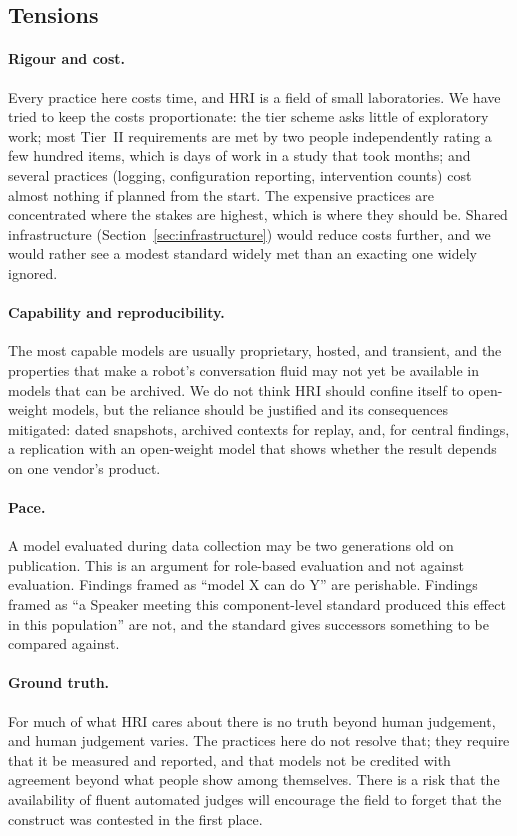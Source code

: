 \subsection{Tensions}

\paragraph{Rigour and cost.} Every practice here costs time, and HRI is a
field of small laboratories. We have tried to keep the costs proportionate:
the tier scheme asks little of exploratory work; most Tier~II requirements
are met by two people independently rating a few hundred items, which is days
of work in a study that took months; and several practices (logging,
configuration reporting, intervention counts) cost almost nothing if planned
from the start. The expensive practices are concentrated where the stakes
are highest, which is where they should be. Shared infrastructure
(Section~\ref{sec:infrastructure}) would reduce costs further, and we would
rather see a modest standard widely met than an exacting one widely ignored.

\paragraph{Capability and reproducibility.} The most capable models are
usually proprietary, hosted, and transient, and the properties that make a
robot's conversation fluid may not yet be available in models that can be
archived. We do not think HRI should confine itself to open-weight models,
but the reliance should be justified \cite{palmer2024using} and its
consequences mitigated: dated snapshots, archived contexts for replay, and,
for central findings, a replication with an open-weight model that shows
whether the result depends on one vendor's product.

\paragraph{Pace.} A model evaluated during data collection may be two
generations old on publication. This is an argument for role-based evaluation
and not against evaluation. Findings framed as ``model X can do Y'' are
perishable. Findings framed as ``a Speaker meeting this component-level
standard produced this effect in this population'' are not, and the standard
gives successors something to be compared against.

\paragraph{Ground truth.} For much of what HRI cares about there is no
truth beyond human judgement, and human judgement varies. The practices here
do not resolve that; they require that it be measured and reported, and that
models not be credited with agreement beyond what people show among
themselves. There is a risk that the availability of fluent automated judges
will encourage the field to forget that the construct was contested in the
first place.

